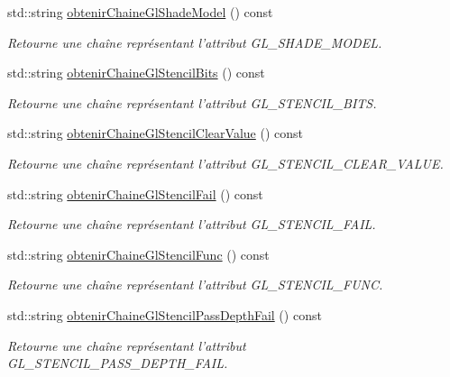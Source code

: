 \begin{DoxyCompactItemize}
std\-::string \hyperlink{group__utilitaire_gaef3c863fd714bcd6607a7fe129c6c1d4}{obtenir\-Chaine\-Gl\-Shade\-Model} () const 
\begin{DoxyCompactList}\small\item\em Retourne une chaîne représentant l'attribut G\-L\-\_\-\-S\-H\-A\-D\-E\-\_\-\-M\-O\-D\-E\-L. \end{DoxyCompactList}\item 
std\-::string \hyperlink{group__utilitaire_ga9001f71cc6ac9cb771d5e9eeedd69c5a}{obtenir\-Chaine\-Gl\-Stencil\-Bits} () const 
\begin{DoxyCompactList}\small\item\em Retourne une chaîne représentant l'attribut G\-L\-\_\-\-S\-T\-E\-N\-C\-I\-L\-\_\-\-B\-I\-T\-S. \end{DoxyCompactList}\item 
std\-::string \hyperlink{group__utilitaire_ga0949a92c39c09a594a65cb035d992baf}{obtenir\-Chaine\-Gl\-Stencil\-Clear\-Value} () const 
\begin{DoxyCompactList}\small\item\em Retourne une chaîne représentant l'attribut G\-L\-\_\-\-S\-T\-E\-N\-C\-I\-L\-\_\-\-C\-L\-E\-A\-R\-\_\-\-V\-A\-L\-U\-E. \end{DoxyCompactList}\item 
std\-::string \hyperlink{group__utilitaire_ga3022225d3598456c739303b98e9d6ff8}{obtenir\-Chaine\-Gl\-Stencil\-Fail} () const 
\begin{DoxyCompactList}\small\item\em Retourne une chaîne représentant l'attribut G\-L\-\_\-\-S\-T\-E\-N\-C\-I\-L\-\_\-\-F\-A\-I\-L. \end{DoxyCompactList}\item 
std\-::string \hyperlink{group__utilitaire_ga1afa1d486d88c628562ec9e9ba6f6e10}{obtenir\-Chaine\-Gl\-Stencil\-Func} () const 
\begin{DoxyCompactList}\small\item\em Retourne une chaîne représentant l'attribut G\-L\-\_\-\-S\-T\-E\-N\-C\-I\-L\-\_\-\-F\-U\-N\-C. \end{DoxyCompactList}\item 
std\-::string \hyperlink{group__utilitaire_ga2e0217d78bce7c9e8aa865fa1b2d7e1f}{obtenir\-Chaine\-Gl\-Stencil\-Pass\-Depth\-Fail} () const 
\begin{DoxyCompactList}\small\item\em Retourne une chaîne représentant l'attribut G\-L\-\_\-\-S\-T\-E\-N\-C\-I\-L\-\_\-\-P\-A\-S\-S\-\_\-\-D\-E\-P\-T\-H\-\_\-\-F\-A\-I\-L. \end{DoxyCompactList}\item 

\end{DoxyCompactItemize}
